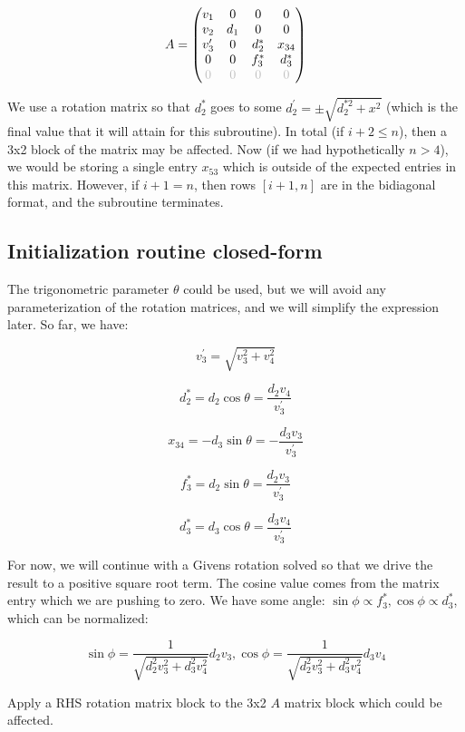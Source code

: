 \documentclass{article}
\begin{document}
$$
A
=
\left(\begin{matrix}
    v_1 & 0 & 0 & 0 \\
    v_2 & d_1 & 0 & 0 \\
    v_3^\prime & 0 & d_2^* & x_{34} \\
    0 & 0 & f_3^* & d_3^* \\
    \textcolor{lightgray}{0} & \textcolor{lightgray}{0} & \textcolor{lightgray}{0} & \textcolor{lightgray}{0}
\end{matrix}\right)
$$

We use a rotation matrix so that $d_2^*$ goes to some $d_2^\prime = \pm \sqrt{d_2^{*2} + x^2}$ (which is the final value that it will attain for this subroutine). In total (if $i + 2 \le n$), then a 3x2 block of the matrix may be affected. Now (if we had hypothetically $n > 4$), we would be storing a single entry $x_{53}$ which is outside of the expected entries in this matrix. However, if $i + 1 = n$, then rows $[i + 1, n]$ are in the bidiagonal format, and the subroutine terminates.

\subsection{Initialization routine closed-form}

The trigonometric parameter $\theta$ could be used, but we will avoid any parameterization of the rotation matrices, and we will simplify the expression later. So far, we have:

$$v_3^\prime = \sqrt{v_3^2 + v_4^2}$$

$$d_2^* = d_2 \cos\theta = \frac{d_2 v_4}{v_3^\prime}$$

$$x_{34} = -d_3 \sin\theta = -\frac{d_3 v_3}{v_3^\prime}$$

$$f_3^* = d_2 \sin\theta = \frac{d_2 v_3}{v_3^\prime}$$

$$d_3^* = d_3 \cos\theta = \frac{d_3 v_4}{v_3^\prime}$$

For now, we will continue with a Givens rotation solved so that we drive the result to a positive square root term. The cosine value comes from the matrix entry which we are pushing to zero. We have some angle: $\sin\phi \propto f_3^*, \cos\phi \propto d_3^*$, which can be normalized:

$$
\sin\phi = \frac{1}{\sqrt{d_2^2 v_3^2 + d_3^2 v_4^2}} d_2 v_3,
\cos\phi = \frac{1}{\sqrt{d_2^2 v_3^2 + d_3^2 v_4^2}} d_3 v_4
$$

Apply a RHS rotation matrix block to the 3x2 $A$ matrix block which could be affected.
\end{document}
